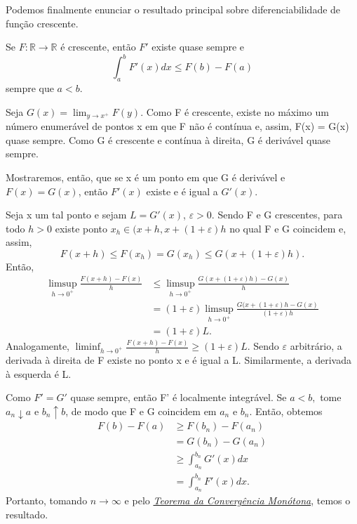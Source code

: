 \documentclass[measure_theory.tex]{subfiles}
\begin{document}
Podemos finalmente enunciar o resultado principal sobre diferenciabilidade de função crescente.
\begin{theorem*}
	Se \(F:\mathbb{R}\rightarrow \mathbb{R}\) é crescente, então \(F'\) existe quase sempre e
	\[
		\int_{a}^{b}F'(x)dx \leq F(b) - F(a)
	\]
	sempre que \(a < b.\)
\end{theorem*}
\begin{proof*}
	Seja \(G(x) = \lim_{y\to x^{+}}F(y).\) Como F é crescente, existe no máximo um número enumerável de pontos x em que F não é contínua e, assim, F(x) = G(x) quase sempre.
	Como G é crescente e contínua à direita, G é derivável quase sempre.

	Mostraremos, então, que se x é um ponto em que G é derivável e \(F(x) = G(x)\), então \(F'(x)\) existe e é igual a \(G'(x).\)

	Seja x um tal ponto e sejam \(L = G'(x)\), \(\varepsilon > 0.\) Sendo F e G crescentes, para todo \(h > 0\) existe ponto \(x_{h}\in (x+h, x + (1+\varepsilon )h\) no qual F e G coincidem e, assim,
	\[
		F(x+h) \leq F(x_{h}) = G(x_{h}) \leq G(x+(1+\varepsilon )h).
	\]
	Então,
	\begin{align*}
		\limsup_{h\to 0^{+}}\frac{F(x+h) - F(x)}{h} & \leq \limsup_{h\to 0^{+}}\frac{G(x+(1+\varepsilon )h)-G(x)}{h}                               \\
		                                            & = (1+\varepsilon )\limsup_{h\to 0^{+}}\frac{G(x+(1+\varepsilon )h - G(x)}{(1+\varepsilon )h} \\
		                                            & = (1+\varepsilon )L.
	\end{align*}
	Analogamente, \(\liminf_{h\to 0^{+}}\frac{F(x+h)-F(x)}{h}\geq (1+\varepsilon )L.\) Sendo \(\varepsilon \) arbitrário, a derivada à direita de F existe no ponto x e é igual a L. Similarmente, a derivada à esquerda é L.

	Como \(F'=G'\) quase sempre, então F' é localmente integrável. Se \(a < b,\) tome \(a_{n}\downarrow a\) e \(b_{n}\uparrow b\), de modo que F e G coincidem em \(a_{n}\) e \(b_{n}\). Então, obtemos
	\begin{align*}
		F(b) - F(a) & \geq F(b_{n}) - F(a_{n})         \\
		            & = G(b_{n}) - G(a_{n})            \\
		            & \geq \int_{a_{n}}^{b_{n}}G'(x)dx \\
		            & = \int_{a_{n}}^{b_{n}}F'(x)dx.
	\end{align*}
	Portanto, tomando \(n\to \infty\) e pelo \hyperlink{monotone_convergence}{\textit{Teorema da Convergência Monótona}}, temos o resultado. \qedsymbol
\end{proof*}
\end{document}
